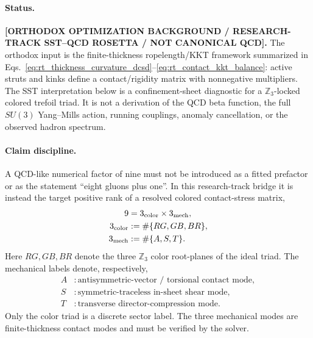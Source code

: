 \paragraph{Status.}
\textbf{[ORTHODOX OPTIMIZATION BACKGROUND / RESEARCH-TRACK SST--QCD ROSETTA / NOT CANONICAL QCD].}
The orthodox input is the finite-thickness ropelength/KKT framework summarized in
Eqs.~\eqref{eq:rt_thickness_curvature_dcsd}--\eqref{eq:rt_contact_kkt_balance}: active
struts and kinks define a contact/rigidity matrix with nonnegative multipliers.
The SST interpretation below is a confinement-sheet diagnostic for a
\(\mathbb Z_3\)-locked colored trefoil triad.  It is not a derivation of the QCD
beta function, the full \(SU(3)\) Yang--Mills action, running couplings, anomaly
cancellation, or the observed hadron spectrum.

\paragraph{Claim discipline.}
A QCD-like numerical factor of nine must not be introduced as a fitted prefactor
or as the statement ``eight gluons plus one''.  In this research-track bridge it
is instead the target positive rank of a resolved colored contact-stress matrix,
\begin{align}
    9
    &=
    3_{\rm color}\times 3_{\rm mech},
    \label{eq:rt_rank9_factorization}\\
    3_{\rm color}
    &:=
    \#\{RG,GB,BR\},\\
    3_{\rm mech}
    &:=
    \#\{A,S,T\}.
\end{align}
Here \(RG,GB,BR\) denote the three \(\mathbb Z_3\) color root-planes of the
ideal triad.  The mechanical labels denote, respectively,
\begin{align}
    A&: \text{antisymmetric-vector / torsional contact mode},\\
    S&: \text{symmetric-traceless in-sheet shear mode},\\
    T&: \text{transverse director-compression mode}.
\end{align}
Only the color triad is a discrete sector label.  The three mechanical modes are
finite-thickness contact modes and must be verified by the solver.

